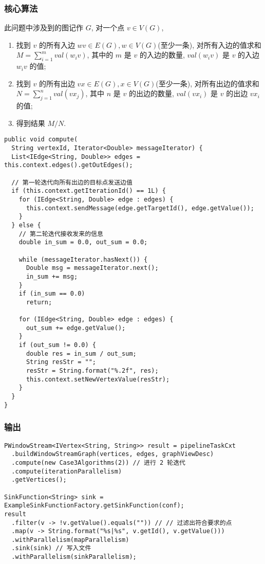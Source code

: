 \subsubsection{核心算法}

此问题中涉及到的图记作 $ G $, 对一个点 $ v \in V(G) $,
\begin{enumerate}
  \item 找到 $ v $ 的所有入边 $ wv \in E(G), w \in V(G) $(至少一条),
    对所有入边的值求和 $ M=\sum_{i=1}^{m} val(w_iv) $, 其中的 $ m $ 是 $ v $
    的入边的数量, $ val(w_iv) $ 是 $ v $ 的入边 $ w_iv $ 的值;
  \item 找到 $ v $ 的所有出边 $ vx \in E(G), x \in V(G) $(至少一条),
    对所有出边的值求和 $ N=\sum_{j=1}^{n} val(vx_j)$, 其中 $ n $ 是 $ v $
    的出边的数量, $ val(vx_i) $ 是 $ v $ 的出边 $ vx_i $ 的值;
  \item 得到结果 $ M / N $.
\end{enumerate}

\begin{center}
\begin{verbatim}
public void compute(
  String vertexId, Iterator<Double> messageIterator) {
  List<IEdge<String, Double>> edges = this.context.edges().getOutEdges();

  // 第一轮迭代向所有出边的目标点发送边值
  if (this.context.getIterationId() == 1L) {
    for (IEdge<String, Double> edge : edges) {
      this.context.sendMessage(edge.getTargetId(), edge.getValue());
    }
  } else {
    // 第二轮迭代接收发来的信息
    double in_sum = 0.0, out_sum = 0.0;

    while (messageIterator.hasNext()) {
      Double msg = messageIterator.next();
      in_sum += msg;
    }
    if (in_sum == 0.0)
      return;

    for (IEdge<String, Double> edge : edges) {
      out_sum += edge.getValue();
    }
    if (out_sum != 0.0) {
      double res = in_sum / out_sum;
      String resStr = "";
      resStr = String.format("%.2f", res);
      this.context.setNewVertexValue(resStr);
    }
  }
}
\end{verbatim}
\end{center}

\subsubsection{输出}
\begin{center}
\begin{verbatim}
PWindowStream<IVertex<String, String>> result = pipelineTaskCxt
  .buildWindowStreamGraph(vertices, edges, graphViewDesc)
  .compute(new Case3Algorithms(2)) // 进行 2 轮迭代
  .compute(iterationParallelism)
  .getVertices();

SinkFunction<String> sink = ExampleSinkFunctionFactory.getSinkFunction(conf);
result
  .filter(v -> !v.getValue().equals("")) // // 过滤出符合要求的点
  .map(v -> String.format("%s|%s", v.getId(), v.getValue()))
  .withParallelism(mapParallelism)
  .sink(sink) // 写入文件
  .withParallelism(sinkParallelism);
\end{verbatim}
\end{center}
